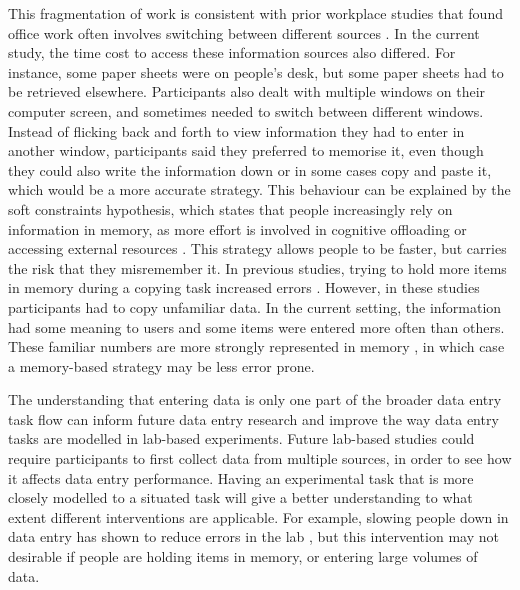This fragmentation of work is consistent with prior workplace studies that found  office work often involves switching between different sources \citep{Cangiano2009, Czerwinski2004, Mark2005, Sellberg2014}. In the current study, the time cost to access these information sources also differed. For instance, some paper sheets were on people's desk, but some paper sheets had to be retrieved elsewhere. Participants also dealt with multiple windows on their computer screen, and sometimes needed to switch between different windows. Instead of flicking back and forth to view information they had to enter in another window, participants said they preferred to memorise it, even though they could also write the information down or in some cases copy and paste it, which would be a more accurate strategy. This behaviour can be explained by the soft constraints hypothesis, which states that people increasingly rely on information in memory, as more effort is involved in cognitive offloading or accessing external resources \citep{Gray2006}. This strategy allows people to be faster, but carries the risk that they misremember it. In previous studies, trying to hold more items in memory during a copying task increased errors \citep[e.g.][]{Borghouts2015, Morgan2009}. However, in these studies participants had to copy unfamiliar data. In the current setting, the information had some meaning to users and some items were entered more often than others. These familiar numbers are more strongly represented in memory \citep{Wiseman2014}, in which case a memory-based strategy may be less error prone.

The understanding that entering data is only one part of the broader data entry task flow can inform future data entry research and improve the way data entry tasks are modelled in lab-based experiments. Future lab-based studies could require participants to first collect data from multiple sources, in order to see how it affects data entry performance. Having an experimental task that is more closely modelled to a situated task will give a better understanding to what extent different interventions are applicable. For example, slowing people down in data entry has shown to reduce errors in the lab \citep{Gould2016, Wiseman2013a}, but this intervention may not desirable if people are holding items in memory, or entering large volumes of data.

